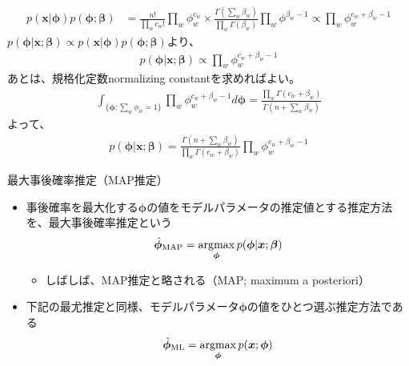 \documentclass[aspectratio=169,unicode,dvipdfmx,14pt]{beamer}
\begin{document}
\begin{frame}
\FontMath
\begin{align}
p(\bm{x}|\bm{\phi})p(\bm{\phi};\bm{\beta})
& =
\frac{n!}{\prod_w c_w!} \prod_w \phi_w^{c_w} \times \frac{\Gamma(\sum_w \beta_w)}{\prod_w \Gamma(\beta_w)}\prod_w \phi^{\beta_w - 1}
\propto
\prod_w \phi_w^{c_w + \beta_w - 1}
\end{align}
$p(\bm{\phi}|\bm{x};\bm{\beta}) \propto p(\bm{x}|\bm{\phi})p(\bm{\phi};\bm{\beta})$より、
\begin{align}
p(\bm{\phi} | \bm{x}; \bm{\beta}) \propto \prod_w \phi_w^{c_w + \beta_w - 1}
\end{align}
あとは、規格化定数normalizing constantを求めればよい。
\begin{align}
\int_{\{ \bm{\phi}: \sum_w \phi_w = 1 \}} \prod_w \phi_w^{c_w + \beta_w - 1} d\bm{\phi} 
= \frac{\prod_w \Gamma(c_w+\beta_w)}{\Gamma(n + \sum_w \beta_w)}
\end{align}
よって、
\begin{align}
p(\bm{\phi} | \bm{x}; \bm{\beta}) = \frac{\Gamma(n + \sum_w \beta_w)}{\prod_w \Gamma(c_w+\beta_w)}
\prod_w \phi_w^{c_w + \beta_w - 1}
\end{align}
\end{frame}

\begin{frame}{最大事後確率推定（MAP推定）}
\begin{itemize}
\item 事後確率を最大化する$\bm{\phi}$の値をモデルパラメータの推定値とする推定方法を、最大事後確率推定という
\begin{align}
\hat{\bm{\phi}}_{\mbox{\scriptsize MAP}} = \operatorname*{argmax}_{\bm{\phi}} p(\bm{\phi}|\bm{x};\bm{\beta})
\end{align}
\begin{itemize}
\item しばしば、MAP推定と略される（MAP; maximum a posteriori）
\end{itemize}
\item 下記の最尤推定と同様、モデルパラメータ$\bm{\phi}$の値をひとつ選ぶ推定方法である
\begin{align}
\hat{\bm{\phi}}_{\mbox{\scriptsize ML}} = \operatorname*{argmax}_{\bm{\phi}} p(\bm{x};\bm{\phi})
\end{align}
\end{itemize}
\end{frame}
\end{document}

